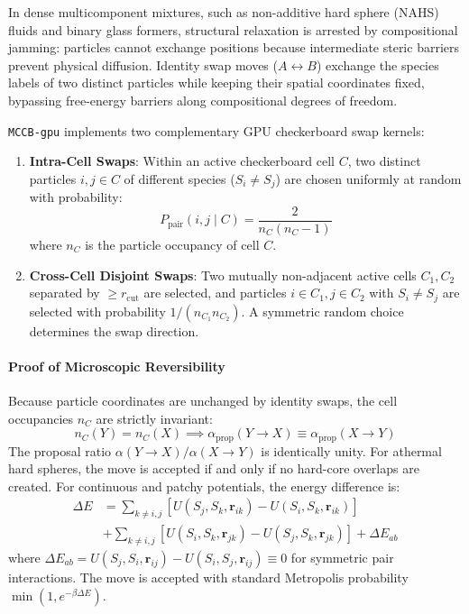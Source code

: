 \documentclass[final,5p,times,twocolumn]{elsarticle}
\begin{document}
In dense multicomponent mixtures, such as non-additive hard sphere
(NAHS) fluids and binary glass formers, structural relaxation is
arrested by compositional jamming: particles cannot exchange positions
because intermediate steric barriers prevent physical
diffusion. Identity swap moves ($A \leftrightarrow B$) exchange the
species labels of two distinct particles while keeping their spatial
coordinates fixed, bypassing free-energy barriers along
compositional degrees of freedom. 

\texttt{MCCB-gpu} implements two complementary GPU checkerboard swap
kernels: 
\begin{enumerate}
    \item \textbf{Intra-Cell Swaps}: Within an active checkerboard
      cell $C$, two distinct particles $i, j \in C$ of different
      species ($S_i \neq S_j$) are chosen uniformly at random with
      probability: 
    \begin{equation}
        P_{\text{pair}}(i, j \mid C) = \frac{2}{n_C(n_C - 1)}
    \end{equation}
    where $n_C$ is the particle occupancy of cell $C$.
    \item \textbf{Cross-Cell Disjoint Swaps}: Two mutually
      non-adjacent active cells $C_1, C_2$ separated by $\ge
      r_{\text{cut}}$ are selected, and particles $i \in C_1, j \in
      C_2$ with $S_i \neq S_j$ are selected with probability $1 /
      (n_{C_1} n_{C_2})$. A symmetric random choice determines the
      swap direction. 
\end{enumerate}

\paragraph{Proof of Microscopic Reversibility}
Because particle coordinates are unchanged by identity swaps, the cell
occupancies $n_C$ are strictly invariant: 
\begin{equation}
    n_C(Y) = n_C(X) \implies \alpha_{\text{prop}}(Y \to X) \equiv \alpha_{\text{prop}}(X \to Y)
\end{equation}
The proposal ratio $\alpha(Y \to X)/\alpha(X \to Y)$ is identically
unity. For athermal hard spheres, the move is accepted if and only if
no hard-core overlaps are created. For continuous and patchy
potentials, the energy difference is: 
\begin{align}
    \Delta E &= \sum_{k \neq i, j} \left[ U(S_j, S_k, \mathbf{r}_{ik}) - U(S_i, S_k, \mathbf{r}_{ik}) \right] \nonumber \\
             &+ \sum_{k \neq i, j} \left[ U(S_i, S_k, \mathbf{r}_{jk}) - U(S_j, S_k, \mathbf{r}_{jk}) \right] + \Delta E_{ab}
\end{align}
where $\Delta E_{ab} = U(S_j, S_i, \mathbf{r}_{ij}) - U(S_i, S_j,
\mathbf{r}_{ij}) \equiv 0$ for symmetric pair interactions. The move
is accepted with standard Metropolis probability $\min(1, e^{-\beta
  \Delta E})$. 
\end{document}
